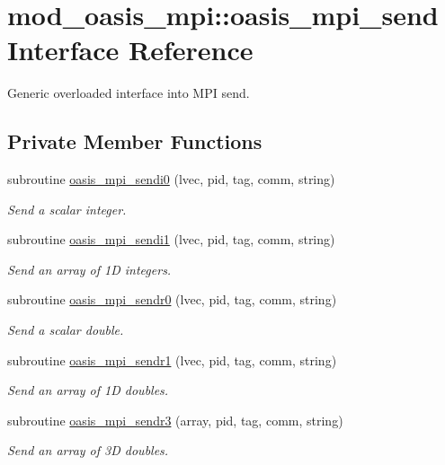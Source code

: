 \hypertarget{interfacemod__oasis__mpi_1_1oasis__mpi__send}{\section{mod\+\_\+oasis\+\_\+mpi\+:\+:oasis\+\_\+mpi\+\_\+send Interface Reference}
\label{interfacemod__oasis__mpi_1_1oasis__mpi__send}
}


Generic overloaded interface into M\+P\+I send.  


\subsection*{Private Member Functions}
\begin{DoxyCompactItemize}
\item 
subroutine \hyperlink{interfacemod__oasis__mpi_1_1oasis__mpi__send_a5b7f0e4f7dc45d398bf564a324dc71c7}{oasis\+\_\+mpi\+\_\+sendi0} (lvec, pid, tag, comm, string)
\begin{DoxyCompactList}\small\item\em Send a scalar integer. \end{DoxyCompactList}\item 
subroutine \hyperlink{interfacemod__oasis__mpi_1_1oasis__mpi__send_af94ce9cce54b9860809fc63d59674e5b}{oasis\+\_\+mpi\+\_\+sendi1} (lvec, pid, tag, comm, string)
\begin{DoxyCompactList}\small\item\em Send an array of 1\+D integers. \end{DoxyCompactList}\item 
subroutine \hyperlink{interfacemod__oasis__mpi_1_1oasis__mpi__send_aefceb49505c9c2e1431ad2666657910d}{oasis\+\_\+mpi\+\_\+sendr0} (lvec, pid, tag, comm, string)
\begin{DoxyCompactList}\small\item\em Send a scalar double. \end{DoxyCompactList}\item 
subroutine \hyperlink{interfacemod__oasis__mpi_1_1oasis__mpi__send_adf9edd2b024a94a75db93e68318f6eff}{oasis\+\_\+mpi\+\_\+sendr1} (lvec, pid, tag, comm, string)
\begin{DoxyCompactList}\small\item\em Send an array of 1\+D doubles. \end{DoxyCompactList}\item 
subroutine \hyperlink{interfacemod__oasis__mpi_1_1oasis__mpi__send_ad712319885937ce4c29b7bb8e66614cf}{oasis\+\_\+mpi\+\_\+sendr3} (array, pid, tag, comm, string)
\begin{DoxyCompactList}\small\item\em Send an array of 3\+D doubles. \end{DoxyCompactList}\end{DoxyCompactItemize}


